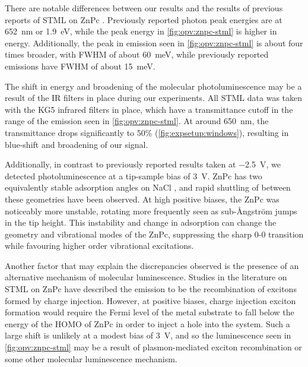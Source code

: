 There are notable differences between our results and the results of previous reports of \ac{STML} on ZnPc \citep{Zhang2016, Doppagne2017, Zhang2017, Doppagne2018}. Previously reported photon peak energies are at \SI{652}{nm} or \SI{1.9}{eV}, while the peak energy in \autoref{fig:opv:znpc-stml} is higher in energy. Additionally, the peak in emission seen in \autoref{fig:opv:znpc-stml} is about four times broader, with \ac{FWHM} of about \SI{60}{meV}, while previously reported emissions have \ac{FWHM} of about \SI{15}{meV}.

The shift in energy and broadening of the molecular photoluminescence may be a result of the IR filters in place during our experiments. All \ac{STML} data was taken with the KG5 infrared filters in place, which have a transmittance cutoff in the range of the emission seen in \autoref{fig:opv:znpc-stml}. At around \SI{650}{nm}, the transmittance drops significantly to 50\% (\autoref{fig:expsetup:windows}), resulting in blue-shift and broadening of our signal. 

Additionally, in contrast to previously reported results taken at \SI{-2.5}{V}, we detected photoluminescence at a tip-sample bias of \SI{3}{V}. ZnPc has two equivalently stable adsorption angles on NaCl \citep{Miwa2016}, and rapid shuttling of between these geometries have been observed. At high positive biases, the ZnPc was noticeably more unstable, rotating more frequently seen as sub-\AA ngstr\"om jumps in the tip height. This instability and change in adsorption can change the geometry and vibrational modes of the ZnPc, suppressing the sharp 0-0 transition while favouring higher order vibrational excitations. 

Another factor that may explain the discrepancies observed is the presence of an alternative mechanism of molecular luminescence. Studies in the literature on \ac{STML} on ZnPc have described the emission to be the recombination of excitons formed by charge injection. However, at positive biases, charge injection exciton formation would require the Fermi level of the metal substrate to fall below the energy of the \ac{HOMO} of ZnPc in order to inject a hole into the system. Such a large shift is unlikely at a modest bias of \SI{3}{V}, and so the luminescence seen in \autoref{fig:opv:znpc-stml} may be a result of plasmon-mediated exciton recombination or some other molecular luminescence mechanism.








